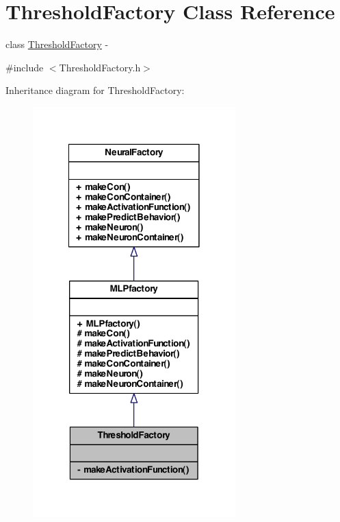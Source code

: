 \hypertarget{class_threshold_factory}{
\section{ThresholdFactory Class Reference}
\label{class_threshold_factory}
}


class \hyperlink{class_threshold_factory}{ThresholdFactory} -\/  




{\ttfamily \#include $<$ThresholdFactory.h$>$}



Inheritance diagram for ThresholdFactory:
\nopagebreak
\begin{figure}[H]
\begin{center}
\leavevmode
\includegraphics[width=222pt]{class_threshold_factory__inherit__graph}
\end{center}
\end{figure}


